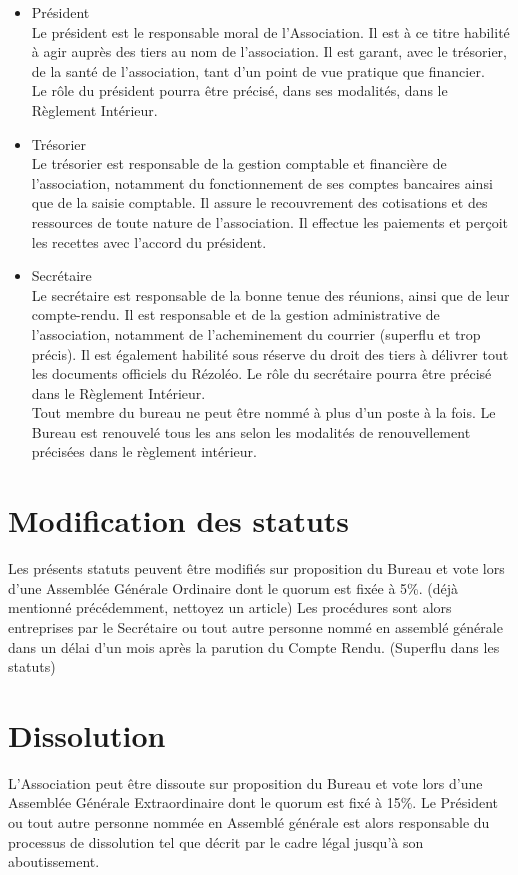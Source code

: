 \documentclass[12pt]{constitution}
\begin{document}
	\begin{itemize}
		\item[\textbullet] Président \\
		 Le président est le responsable moral de l’Association. Il est à ce titre habilité à agir auprès des tiers au nom de l’association. Il est garant, avec le trésorier, de la santé de l’association, tant d’un point de vue pratique que financier.\\
		Le rôle du président pourra être précisé, dans ses modalités, dans le Règlement Intérieur. \newpage
		\item[\textbullet] Trésorier \\
		Le trésorier est responsable de la gestion comptable et financière de l’association, notamment du fonctionnement de ses comptes bancaires ainsi que de la saisie comptable. Il assure le recouvrement des cotisations et des ressources de toute nature de l’association. Il effectue les paiements et perçoit les recettes avec l’accord du président.\\
		
		\item[\textbullet] Secrétaire\\
		Le secrétaire est responsable de la bonne tenue des réunions, ainsi que de leur compte-rendu. Il est responsable et de la gestion administrative de l’association, notamment de l’acheminement du courrier (superflu et trop précis). Il est également habilité sous réserve du droit des tiers à délivrer tout les documents officiels du Rézoléo.  Le rôle du secrétaire pourra être précisé dans le Règlement Intérieur. \\
		
		Tout membre du bureau ne peut être nommé à plus d'un poste à la fois. Le Bureau est renouvelé tous les ans selon les modalités de renouvellement précisées dans le règlement intérieur.\\
	\end{itemize}
	
	
	\section{Modification des statuts}
	Les présents statuts peuvent être modifiés sur proposition du Bureau et vote lors d'une Assemblée Générale Ordinaire dont le quorum est fixée à 5\%. (déjà mentionné précédemment, nettoyez un article)
	Les procédures sont alors entreprises par le Secrétaire ou tout autre personne nommé en assemblé générale dans un délai d’un mois après la parution du Compte Rendu. (Superflu dans les statuts)
	
	\section{Dissolution}
	L’Association peut être dissoute sur proposition du Bureau et vote lors d'une Assemblée Générale Extraordinaire dont le quorum est fixé à 15\%.
	Le Président ou tout autre personne nommée en Assemblé générale est alors responsable du processus de dissolution tel que décrit par le cadre légal jusqu’à son aboutissement.
\end{document}
